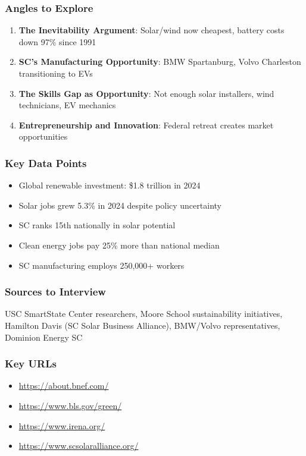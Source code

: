 \documentclass[11pt,letterpaper]{article}
\begin{document}
\subsubsection*{Angles to Explore}
\begin{enumerate}[noitemsep]
    \item \textbf{The Inevitability Argument}: Solar/wind now cheapest, battery costs down 97\% since 1991
    \item \textbf{SC's Manufacturing Opportunity}: BMW Spartanburg, Volvo Charleston transitioning to EVs
    \item \textbf{The Skills Gap as Opportunity}: Not enough solar installers, wind technicians, EV mechanics
    \item \textbf{Entrepreneurship and Innovation}: Federal retreat creates market opportunities
\end{enumerate}

\subsubsection*{Key Data Points}
\begin{itemize}[noitemsep]
    \item Global renewable investment: \$1.8 trillion in 2024
    \item Solar jobs grew 5.3\% in 2024 despite policy uncertainty
    \item SC ranks 15th nationally in solar potential
    \item Clean energy jobs pay 25\% more than national median
    \item SC manufacturing employs 250,000+ workers
\end{itemize}

\subsubsection*{Sources to Interview}
USC SmartState Center researchers, Moore School sustainability initiatives, Hamilton Davis (SC Solar Business Alliance), BMW/Volvo representatives, Dominion Energy SC

\subsubsection*{Key URLs}
\begin{itemize}[noitemsep]
    \item \url{https://about.bnef.com/}
    \item \url{https://www.bls.gov/green/}
    \item \url{https://www.irena.org/}
    \item \url{https://www.scsolaralliance.org/}
\end{itemize}
\end{document}
